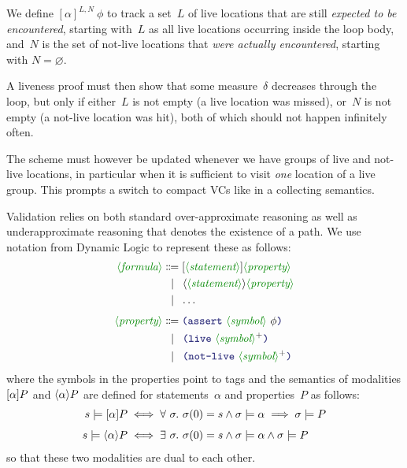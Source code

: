 \documentclass[runningheads]{llncs}
\begin{document}

We define $[\alpha]^{L,N}~\phi$ to track a set~$L$ of live locations
that are still \emph{expected to be encountered}, starting with~$L$
as all live locations occurring inside the loop body,
and~$N$ is the set of not-live locations that \emph{were actually encountered},
starting with $N = \varnothing$.

A liveness proof must then show that some measure~$\delta$
decreases through the loop, but only if either~$L$ is not empty
(a live location was missed),
or~$N$ is not empty
(a not-live location was hit),
both of which should not happen infinitely often.

The scheme must however be updated whenever we have groups of live and not-live locations,
in particular when it is sufficient to visit \emph{one} location of a live group.
This prompts a switch to compact VCs like in a collecting semantics.


Validation relies on both standard over-approximate reasoning
as well as underapproximate reasoning that denotes the existence of a path.
We use notation from Dynamic Logic to represent these as follows:
\begin{align*}
\nonterminal{formula}
    & \Coloneqq \BOX{\nonterminal{statement}}{\nonterminal{property}} \\
    & \alt      \DIA{\nonterminal{statement}}{\nonterminal{property}} \\
    & \alt \dots \\[4pt]
\nonterminal{property}
    & \Coloneqq \LP \terminal{assert}~ \nonterminal{symbol}~ \phi \RP \\
    & \alt      \LP \terminal{live}~ \nonterminal{symbol}\rplus \RP \\
    & \alt      \LP \terminal{not-live}~ \nonterminal{symbol}\rplus \RP
\end{align*}
where the symbols in the properties point to tags
and the semantics of modalities
$[\alpha]P$ and
$\langle\alpha\rangle P$ are defined
for statements~$\alpha$ and properties~$P$ as follows:
\begin{align*}
s \models [\alpha]P
    & \iff
        \forall\ \sigma.\ \sigma(0) = s \land \sigma \models \alpha
                \implies \sigma \models P \\[4pt]
s \models \langle\alpha\rangle P
    & \iff
        \exists\ \sigma.\ \sigma(0) = s \land \sigma \models \alpha
                \land \sigma \models P
\end{align*}
so that these two modalities are dual to each other.
\end{document}
